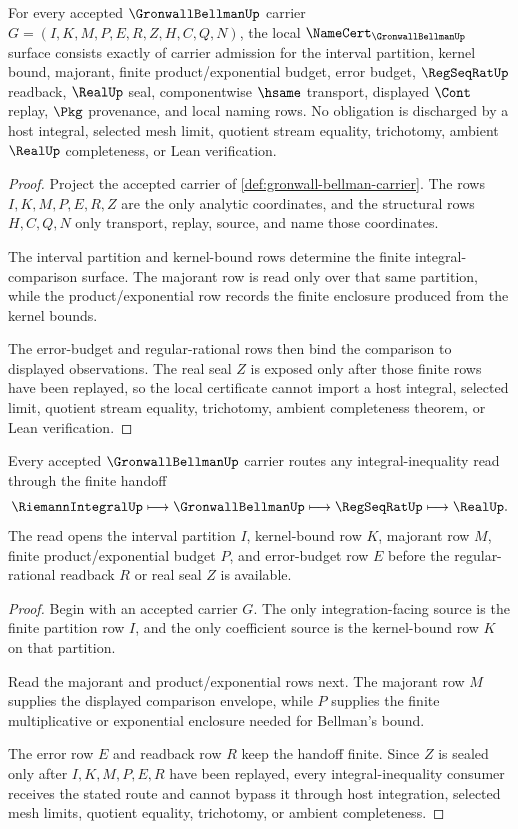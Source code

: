 \begin{theorem}
\label{thm:gronwall-bellman-namecert-obligations}
For every accepted $\GronwallBellmanUp$ carrier $G=(I,K,M,P,E,R,Z,H,C,Q,N)$, the local $\NameCert_{\GronwallBellmanUp}$ surface consists exactly of carrier admission for the interval partition, kernel bound, majorant, finite product/exponential budget, error budget, $\RegSeqRatUp$ readback, $\RealUp$ seal, componentwise $\hsame$ transport, displayed $\Cont$ replay, $\Pkg$ provenance, and local naming rows. No obligation is discharged by a host integral, selected mesh limit, quotient stream equality, trichotomy, ambient $\RealUp$ completeness, or Lean verification.
\end{theorem}
\begin{proof}
Project the accepted carrier of \autoref{def:gronwall-bellman-carrier}. The rows $I,K,M,P,E,R,Z$ are the only analytic coordinates, and the structural rows $H,C,Q,N$ only transport, replay, source, and name those coordinates.

The interval partition and kernel-bound rows determine the finite integral-comparison surface. The majorant row is read only over that same partition, while the product/exponential row records the finite enclosure produced from the kernel bounds.

The error-budget and regular-rational rows then bind the comparison to displayed observations. The real seal $Z$ is exposed only after those finite rows have been replayed, so the local certificate cannot import a host integral, selected limit, quotient stream equality, trichotomy, ambient completeness theorem, or Lean verification.
\end{proof}

\begin{theorem}
\label{thm:gronwall-bellman-finite-partition-handoff}
Every accepted $\GronwallBellmanUp$ carrier routes any integral-inequality read through the finite handoff
$$
\RiemannIntegralUp \longmapsto \GronwallBellmanUp \longmapsto \RegSeqRatUp \longmapsto \RealUp.
$$
The read opens the interval partition $I$, kernel-bound row $K$, majorant row $M$, finite product/exponential budget $P$, and error-budget row $E$ before the regular-rational readback $R$ or real seal $Z$ is available.
\end{theorem}
\begin{proof}
Begin with an accepted carrier $G$. The only integration-facing source is the finite partition row $I$, and the only coefficient source is the kernel-bound row $K$ on that partition.

Read the majorant and product/exponential rows next. The majorant row $M$ supplies the displayed comparison envelope, while $P$ supplies the finite multiplicative or exponential enclosure needed for Bellman's bound.

The error row $E$ and readback row $R$ keep the handoff finite. Since $Z$ is sealed only after $I,K,M,P,E,R$ have been replayed, every integral-inequality consumer receives the stated route and cannot bypass it through host integration, selected mesh limits, quotient equality, trichotomy, or ambient completeness.
\end{proof}

